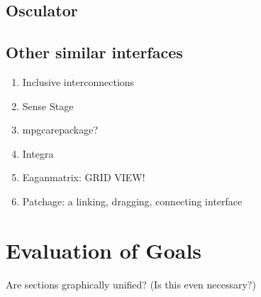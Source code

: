 	\subsection{Osculator} %
	\label{sub:osculator}
		\cite{osculator}

	\subsection{Other similar interfaces} %
	\label{sub:other_similar_interfaces}
	
	\begin{enumerate}
		\item Inclusive interconnections 
		\item Sense Stage 
		\item mpgcarepackage?
		\item Integra 
		\item Eaganmatrix: GRID VIEW! 
		\item Patchage: a linking, dragging, connecting interface 
	\end{enumerate}



\section{Evaluation of Goals} %
\label{sec:evaluation_of_goals}
	Are sections graphically unified? (Is this even necessary?)






